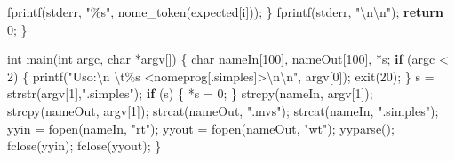 \documentclass[
  brazilian,
  letterpaper,
]{book}
\newenvironment{Shaded}{\begin{snugshade}}{\end{snugshade}}
\newcommand{\ControlFlowTok}[1]{\textcolor[rgb]{0.00,0.23,0.31}{\textbf{#1}}}
\newcommand{\DataTypeTok}[1]{\textcolor[rgb]{0.68,0.00,0.00}{#1}}
\newcommand{\DecValTok}[1]{\textcolor[rgb]{0.68,0.00,0.00}{#1}}
\newcommand{\NormalTok}[1]{\textcolor[rgb]{0.00,0.23,0.31}{#1}}
\newcommand{\OperatorTok}[1]{\textcolor[rgb]{0.37,0.37,0.37}{#1}}
\newcommand{\SpecialCharTok}[1]{\textcolor[rgb]{0.37,0.37,0.37}{#1}}
\newcommand{\StringTok}[1]{\textcolor[rgb]{0.13,0.47,0.30}{#1}}
\theoremstyle{plain}
\theoremstyle{definition}
\theoremstyle{remark}
\begin{document}
\begin{Shaded}
\begin{Highlighting}[]
\NormalTok{        fprintf}\OperatorTok{(}\NormalTok{stderr}\OperatorTok{,} \StringTok{"}\SpecialCharTok{\%s}\StringTok{"}\OperatorTok{,}\NormalTok{ nome\_token}\OperatorTok{(}\NormalTok{expected}\OperatorTok{[}\NormalTok{i}\OperatorTok{]));}
    \OperatorTok{\}}
\NormalTok{    fprintf}\OperatorTok{(}\NormalTok{stderr}\OperatorTok{,} \StringTok{"}\SpecialCharTok{\textbackslash{}n\textbackslash{}n}\StringTok{"}\OperatorTok{);}
    \ControlFlowTok{return} \DecValTok{0}\OperatorTok{;}
\OperatorTok{\}}

\DataTypeTok{int}\NormalTok{ main}\OperatorTok{(}\DataTypeTok{int}\NormalTok{ argc}\OperatorTok{,} \DataTypeTok{char} \OperatorTok{*}\NormalTok{argv}\OperatorTok{[])} \OperatorTok{\{}
    \DataTypeTok{char}\NormalTok{ nameIn}\OperatorTok{[}\DecValTok{100}\OperatorTok{],}\NormalTok{ nameOut}\OperatorTok{[}\DecValTok{100}\OperatorTok{],} \OperatorTok{*}\NormalTok{s}\OperatorTok{;}
    \ControlFlowTok{if} \OperatorTok{(}\NormalTok{argc }\OperatorTok{\textless{}} \DecValTok{2}\OperatorTok{)} \OperatorTok{\{}
\NormalTok{        printf}\OperatorTok{(}\StringTok{"Uso:}\SpecialCharTok{\textbackslash{}n}\StringTok{ }\SpecialCharTok{\textbackslash{}t\%s}\StringTok{ \textless{}nomeprog[.simples]\textgreater{}}\SpecialCharTok{\textbackslash{}n\textbackslash{}n}\StringTok{"}\OperatorTok{,}\NormalTok{ argv}\OperatorTok{[}\DecValTok{0}\OperatorTok{]);}
\NormalTok{        exit}\OperatorTok{(}\DecValTok{20}\OperatorTok{);}
    \OperatorTok{\}}
\NormalTok{    s }\OperatorTok{=}\NormalTok{ strstr}\OperatorTok{(}\NormalTok{argv}\OperatorTok{[}\DecValTok{1}\OperatorTok{],}\StringTok{".simples"}\OperatorTok{);}
    \ControlFlowTok{if} \OperatorTok{(}\NormalTok{s}\OperatorTok{)} \OperatorTok{\{}
        \OperatorTok{*}\NormalTok{s }\OperatorTok{=} \DecValTok{0}\OperatorTok{;}
    \OperatorTok{\}}
\NormalTok{    strcpy}\OperatorTok{(}\NormalTok{nameIn}\OperatorTok{,}\NormalTok{ argv}\OperatorTok{[}\DecValTok{1}\OperatorTok{]);}
\NormalTok{    strcpy}\OperatorTok{(}\NormalTok{nameOut}\OperatorTok{,}\NormalTok{ argv}\OperatorTok{[}\DecValTok{1}\OperatorTok{]);}
\NormalTok{    strcat}\OperatorTok{(}\NormalTok{nameOut}\OperatorTok{,} \StringTok{".mvs"}\OperatorTok{);}
\NormalTok{    strcat}\OperatorTok{(}\NormalTok{nameIn}\OperatorTok{,} \StringTok{".simples"}\OperatorTok{);}
\NormalTok{    yyin }\OperatorTok{=}\NormalTok{ fopen}\OperatorTok{(}\NormalTok{nameIn}\OperatorTok{,} \StringTok{"rt"}\OperatorTok{);}
\NormalTok{    yyout }\OperatorTok{=}\NormalTok{ fopen}\OperatorTok{(}\NormalTok{nameOut}\OperatorTok{,} \StringTok{"wt"}\OperatorTok{);}
\NormalTok{    yyparse}\OperatorTok{();}
\NormalTok{    fclose}\OperatorTok{(}\NormalTok{yyin}\OperatorTok{);}
\NormalTok{    fclose}\OperatorTok{(}\NormalTok{yyout}\OperatorTok{);}
\OperatorTok{\}}
\end{Highlighting}
\end{Shaded}
\end{document}
